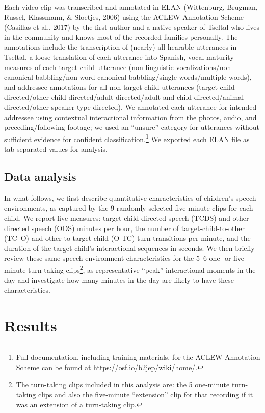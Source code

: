 \documentclass[floatsintext,man]{apa6}
\theoremstyle{definition}
\theoremstyle{definition}
\theoremstyle{definition}
\theoremstyle{remark}
\begin{document}
Each video clip was transcribed and annotated in ELAN (Wittenburg,
Brugman, Russel, Klassmann, \& Sloetjes, 2006) using the ACLEW
Annotation Scheme (Casillas et al., 2017) by the first author and a
native speaker of Tseltal who lives in the community and knows most of
the recorded families personally. The annotations include the
transcription of (nearly) all hearable utterances in Tseltal, a loose
translation of each utterance into Spanish, vocal maturity measures of
each target child utterance (non-linguistic vocalizations/non-canonical
babbling/non-word canonical babbling/single words/multiple words), and
addressee annotations for all non-target-child utterances
(target-child-directed/other-child-directed/adult-directed/adult-and-child-directed/animal-directed/other-speaker-type-directed).
We annotated each utterance for intended addressee using contextual
interactional information from the photos, audio, and
preceding/following footage; we used an \enquote{unsure} category for
utterances without sufficient evidence for confident
classification.\footnote{Full documentation, including training
  materials, for the ACLEW Annotation Scheme can be found at
  \url{https://osf.io/b2jep/wiki/home/}.} We exported each ELAN file as
tab-separated values for analysis.

\subsection{Data analysis}\label{methods-analysisinfo}

In what follows, we first describe quantitative characteristics of
children's speech environments, as captured by the 9 randomly selected
five-minute clips for each child. We report five measures:
target-child-directed speech (TCDS) and other-directed speech (ODS)
minutes per hour, the number of target-child-to-other (TC--O) and
other-to-target-child (O-TC) turn transitions per minute, and the
duration of the target child's interactional sequences in seconds. We
then briefly review these same speech environment characteristics for
the 5--6 one- or five-minute turn-taking clips\footnote{The turn-taking
  clips included in this analysis are: the 5 one-minute turn-taking
  clips and also the five-minute \enquote{extension} clip for that
  recording if it was an extension of a turn-taking clip.}, as
representative \enquote{peak} interactional moments in the day and
investigate how many minutes in the day are likely to have these
characteristics.

\section{Results}\label{results}
\end{document}
